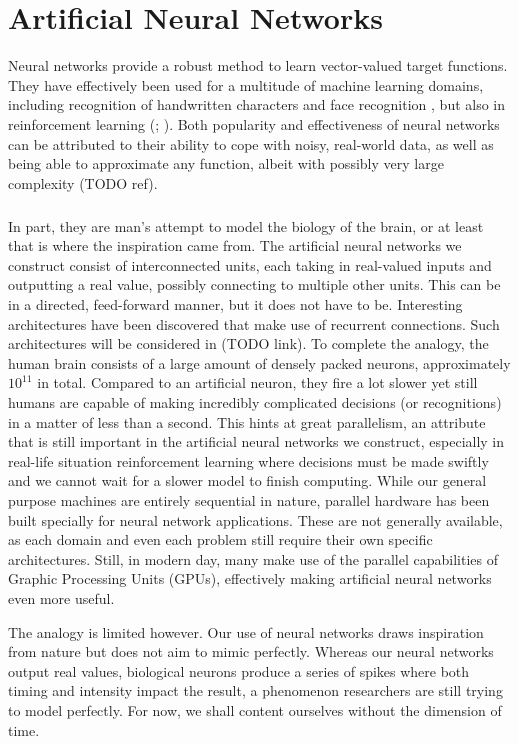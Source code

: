 \chapter{Artificial Neural Networks}
Neural networks provide a robust method to learn
vector-valued target functions.
They have effectively been used for a multitude of machine learning domains,
including recognition of handwritten characters
\parencite{LeCun1989}
and
face recognition
\parencite{Cottreil1991},
but also in reinforcement learning
(\cite{anderson1989}; \cite{lin1993}). %
Both popularity and effectiveness of neural networks can be attributed to
their ability to cope with noisy, real-world data,
as well as being able to approximate any function,
albeit with possibly very large complexity (TODO ref).
\paragraph{}
In part, they are man's attempt
to model the biology of the brain,
or at least that is where the inspiration came from.
The artificial neural networks we construct
consist of interconnected units,
each taking in real-valued inputs
and outputting a real value,
possibly connecting to multiple other units.
This can be in a directed, feed-forward manner,
but it does not have to be.
Interesting architectures have been discovered
that make use of recurrent connections.
Such architectures will be considered in (TODO link).
To complete the analogy,
the human brain consists of a large amount of densely packed neurons,
approximately $10^{11}$ in total.
Compared to an artificial neuron,
they fire a lot slower
yet still humans are capable of
making incredibly complicated decisions
(or recognitions)
in a matter of less than a second.
This hints at great parallelism,
an attribute that is still important
in the artificial neural networks we construct,
especially in real-life situation reinforcement learning
where decisions must be made swiftly and we cannot wait
for a slower model to finish computing.
While our general purpose machines
are entirely sequential in nature,
parallel hardware has been built specially
for neural network applications.
These are not generally available,
as each domain and even each problem
still require their own specific architectures.
Still, in modern day, many make use
of the parallel capabilities of
Graphic Processing Units (GPUs),
effectively making artificial neural networks even more useful.

The analogy is limited however.
Our use of neural networks draws inspiration from nature
but does not aim to mimic perfectly.
Whereas our neural networks output real values,
biological neurons produce a series of spikes
where both timing and intensity impact the result, %
a phenomenon researchers are still trying to model perfectly.
For now,
we shall content ourselves without the dimension of time.

